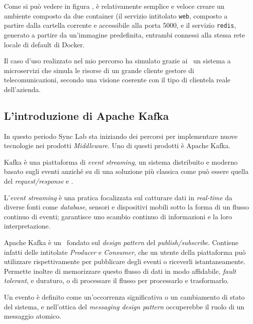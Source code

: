 Come si può vedere in figura \thefigure, è relativamente semplice e veloce creare un ambiente composto da due container (il servizio intitolato \texttt{web}, composto a partire dalla cartella corrente e accessibile alla porta 5000, e il servizio \texttt{redis}, generato a partire da un'immagine predefinita, entrambi connessi alla stessa rete locale di default di Docker.

Il caso d'uso realizzato nel mio percorso ha simulato grazie ai \container\ un sistema a microservizi che simula le risorse di un grande cliente gestore di telecomunicazioni, secondo una visione coerente con il tipo di clientela reale dell'azienda.

\subsection{L'introduzione di Apache Kafka}

In questo periodo Sync Lab sta iniziando dei percorsi per implementare nuove tecnologie nei prodotti \textit{Middleware}.
Uno di questi prodotti è Apache Kafka.

Kafka è una piattaforma di \textit{event streaming}, un sistema distribuito e moderno basato sugli eventi anziché su di una soluzione più classica come può essere quella del \textit{request/response} e .

L'\textit{event streaming} è una pratica focalizzata sul catturare dati in \textit{real-time} da diverse fonti come \textit{database}, sensori e dispositivi mobili sotto la forma di un flusso continuo di eventi; garantisce uno scambio continuo di informazioni e la loro interpretazione.

Apache Kafka è un \software\ fondato sul \textit{design pattern} del \textit{publish/subscribe}.
Contiene infatti delle  intitolate \textit{Producer} e \textit{Consumer}, che un utente della piattaforma può utilizzare rispettivamente per pubblicare degli eventi o riceverli istantaneamente.
Permette inoltre di memorizzare questo flusso di dati in modo affidabile, \textit{fault tolerant}, e duraturo, o di processare il flusso per processarlo e trasformarlo.

Un evento è definito come un'occorrenza significativa o un cambiamento di stato del sistema, e nell'ottica del \textit{messaging design pattern} occuperebbe il ruolo di un messaggio atomico.

